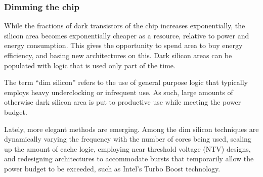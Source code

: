 \subsubsection{Dimming the chip}
While the fractions of dark transistors of the chip increases exponentially, the silicon area becomes exponentially cheaper
as a resource, relative to power and energy consumption. This gives the opportunity to spend area to buy energy efficiency,
and basing new architectures on this. 
Dark silicon areas can be populated with logic that is used only part of the time.

The term ``dim silicon'' refers to the use of general purpose logic that typically employs heavy underclocking or infrequent use.
As such, large amounts of otherwise dark silicon area is put to productive use while meeting the power budget.


Lately, more elegant methods are emerging. Among the dim silicon techniques are dynamically varying the frequency with the
number of cores being used, scaling up the amount of cache logic, employing near threshold voltage (NTV) designs, and redesigning
architectures to accommodate bursts that temporarily allow the power budget to be exceeded, such as Intel's Turbo Boost technology. \cite{dark-silicon}


